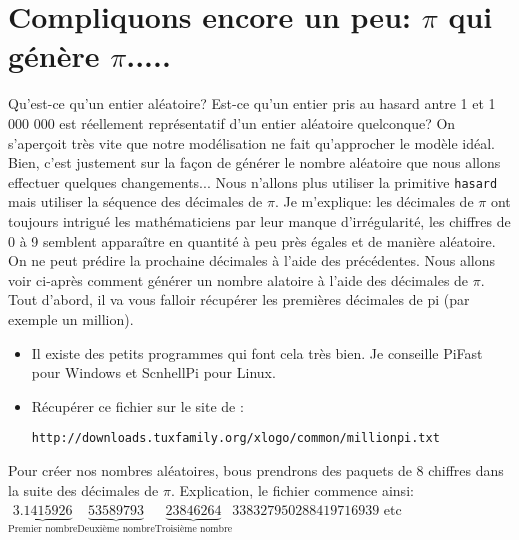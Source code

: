 \section{Compliquons encore un peu: $\pi$ qui génère $\pi$.....}
Qu'est-ce qu'un entier aléatoire? Est-ce qu'un entier pris au hasard antre 1 et 1 000 000 est réellement représentatif d'un entier aléatoire quelconque? On s'aperçoit très vite que notre modélisation ne fait qu'approcher le modèle idéal. Bien, c'est justement sur la façon de générer le nombre aléatoire que nous allons effectuer quelques changements... Nous n'allons plus utiliser la primitive \texttt{hasard} mais utiliser la séquence des décimales de $\pi$. Je m'explique: les décimales de $\pi$ ont toujours intrigué les mathématiciens par leur manque d'irrégularité, les chiffres de 0 à 9 semblent apparaître en quantité à peu près égales et de manière aléatoire. On ne peut prédire la prochaine décimales à l'aide des précédentes. Nous allons voir ci-après comment générer un nombre alatoire à l'aide des décimales de $\pi$. Tout d'abord, il va vous falloir récupérer les premières décimales de pi (par exemple un million).
 \begin{itemize}
 \item Il existe des petits programmes qui font cela très bien.  Je conseille PiFast pour Windows et ScnhellPi pour Linux.
 \item Récupérer ce fichier sur le site de \xlogo: 
\begin{center}
\texttt{http://downloads.tuxfamily.org/xlogo/common/millionpi.txt} 
\end{center}
 \end{itemize}
Pour créer nos nombres aléatoires, bous prendrons des paquets de 8 chiffres dans la suite des décimales de $\pi$. Explication, le fichier commence ainsi:\\
$\underbrace{3.1415926}_{\textrm{Premier nombre}}\underbrace{53589793}_{\textrm{Deuxième nombre}}\underbrace{23846264}_{\textrm{Troisième nombre}}338327950288419716939$ etc\\ \\

